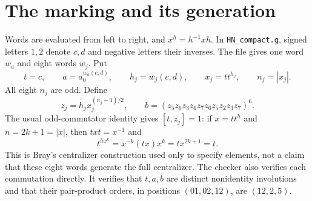 \documentclass[11pt]{article}
\begin{document}
\section{The marking and its generation}
Words are evaluated from left to right, and $x^h=h^{-1}xh$. In \texttt{HN\_compact.g}, signed letters $1,2$ denote $c,d$ and negative letters their inverses. The file gives one word $w_a$ and eight words $w_j$. Put
\[
 t=c,\qquad a=a_0^{w_a(c,d)},\qquad
 h_j=w_j(c,d),\qquad x_j=t t^{h_j},\qquad n_j=|x_j|.
\]
All eight $n_j$ are odd. Define
\[
 z_j=h_jx_j^{(n_j-1)/2},\qquad
 b=(z_5z_6z_3z_6z_7z_6z_5z_2z_3z_7)^6.
\]
The usual odd-commutator identity gives $[t,z_j]=1$: if $x=tt^h$ and $n=2k+1=|x|$, then $txt=x^{-1}$ and
\[
 t^{hx^k}=x^{-k}(tx)x^k=t x^{2k+1}=t.
\]
This is Bray's centralizer construction used only to specify elements, not a claim that these eight words generate the full centralizer. The checker also verifies each commutation directly. It verifies that $t,a,b$ are distinct nonidentity involutions and that their pair-product orders, in positions $(01,02,12)$, are $(12,2,5)$.
\end{document}

